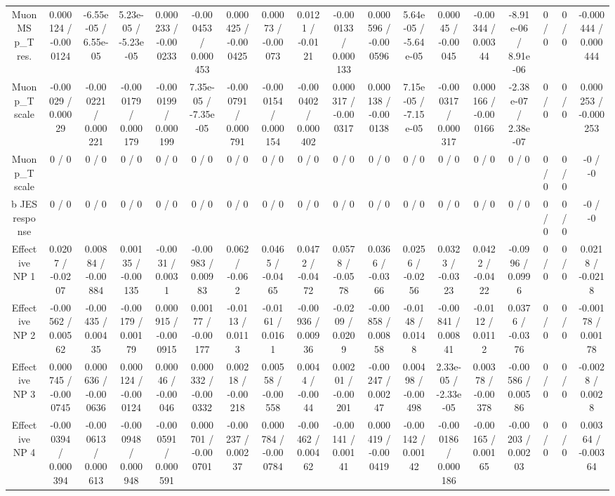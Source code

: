 \documentclass[10pt]{article}
\begin{document}
\begin{table}[htbp]
\begin{center}
\begin{tabular}{|c|c|c|c|c|c|c|c|c|c|c|c|c|c|c|c|c|c|}
  Muon MS p_{T} res. & 0.000124 / -0.000124 & -6.55e-05 / 6.55e-05 & 5.23e-05 / -5.23e-05 & 0.000233 / -0.000233 & -0.000453 / 0.000453 & 0.000425 / -0.000425 & 0.00073 / -0.00073 & 0.0121 / -0.0121 & -0.000133 / 0.000133 & 0.000596 / -0.000596 & 5.64e-05 / -5.64e-05 & 0.00045 / -0.00045 & -0.00344 / 0.00344 & -8.91e-06 / 8.91e-06 & 0 / 0 & 0 / 0 & -0.000444 / 0.000444 \\ 
  Muon p_{T} scale & -0.00029 / 0.00029 & -0.000221 / 0.000221 & -0.000179 / 0.000179 & -0.000199 / 0.000199 & 7.35e-05 / -7.35e-05 & -0.000791 / 0.000791 & -0.000154 / 0.000154 & -0.000402 / 0.000402 & 0.000317 / -0.000317 & 0.000138 / -0.000138 & 7.15e-05 / -7.15e-05 & -0.000317 / 0.000317 & 0.000166 / -0.000166 & -2.38e-07 / 2.38e-07 & 0 / 0 & 0 / 0 & 0.000253 / -0.000253 \\ 
  Muon p_{T} scale & 0 / 0 & 0 / 0 & 0 / 0 & 0 / 0 & 0 / 0 & 0 / 0 & 0 / 0 & 0 / 0 & 0 / 0 & 0 / 0 & 0 / 0 & 0 / 0 & 0 / 0 & 0 / 0 & 0 / 0 & 0 / 0 & -0 / -0 \\ 
  b JES response & 0 / 0 & 0 / 0 & 0 / 0 & 0 / 0 & 0 / 0 & 0 / 0 & 0 / 0 & 0 / 0 & 0 / 0 & 0 / 0 & 0 / 0 & 0 / 0 & 0 / 0 & 0 / 0 & 0 / 0 & 0 / 0 & -0 / -0 \\ 
  Effective NP 1 & 0.0207 / -0.0207 & 0.00884 / -0.00884 & 0.00135 / -0.00135 & -0.0031 / 0.0031 & -0.00983 / 0.00983 & 0.062 / -0.062 & 0.0465 / -0.0465 & 0.0472 / -0.0472 & 0.0578 / -0.0578 & 0.0366 / -0.0366 & 0.0256 / -0.0256 & 0.0323 / -0.0323 & 0.0422 / -0.0422 & -0.0996 / 0.0996 & 0 / 0 & 0 / 0 & 0.0218 / -0.0218 \\ 
  Effective NP 2 & -0.00562 / 0.00562 & -0.00435 / 0.00435 & -0.00179 / 0.00179 & 0.000915 / -0.000915 & 0.00177 / -0.00177 & -0.0113 / 0.0113 & -0.0161 / 0.0161 & -0.00936 / 0.00936 & -0.0209 / 0.0209 & -0.00858 / 0.00858 & -0.0148 / 0.0148 & -0.00841 / 0.00841 & -0.0112 / 0.0112 & 0.0376 / -0.0376 & 0 / 0 & 0 / 0 & -0.00178 / 0.00178 \\ 
  Effective NP 3 & 0.000745 / -0.000745 & 0.000636 / -0.000636 & 0.000124 / -0.000124 & 0.00046 / -0.00046 & 0.000332 / -0.000332 & 0.00218 / -0.00218 & 0.00558 / -0.00558 & 0.0044 / -0.0044 & 0.00201 / -0.00201 & -0.00247 / 0.00247 & 0.00498 / -0.00498 & 2.33e-05 / -2.33e-05 & 0.00378 / -0.00378 & -0.00586 / 0.00586 & 0 / 0 & 0 / 0 & -0.0028 / 0.0028 \\ 
  Effective NP 4 & -0.000394 / 0.000394 & -0.000613 / 0.000613 & -0.000948 / 0.000948 & -0.000591 / 0.000591 & 0.000701 / -0.000701 & -0.00237 / 0.00237 & 0.000784 / -0.000784 & -0.00462 / 0.00462 & -0.00141 / 0.00141 & 0.000419 / -0.000419 & -0.00142 / 0.00142 & -0.000186 / 0.000186 & -0.00165 / 0.00165 & -0.00203 / 0.00203 & 0 / 0 & 0 / 0 & 0.00364 / -0.00364 \\ 

\end{tabular}
\end{center}
\end{table}
\end{document}
